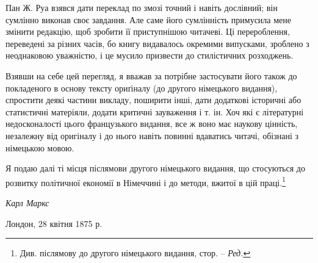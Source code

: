 Пан Ж. Руа взявся дати переклад по змозі точний і навіть
дослівний; він сумлінно виконав своє завдання. Але саме його
сумлінність примусила мене змінити редакцію, щоб зробити її
приступнішою читачеві. Ці перероблення, переведені за різних
часів, бо книгу видавалось окремими випусками, зроблено з
неоднаковою уважністю, і це мусило призвести до стилістичних
розходжень.

Взявши на себе цей перегляд, я вважав за потрібне застосувати
його також до покладеного в основу тексту ориґіналу (до другого
німецького видання), спростити деякі частини викладу, поширити
інші, дати додаткові історичні або статистичні матеріяли, додати
критичні зауваження і т. ін. Хоч які є літературні недосконалості
цього французького видання, все ж воно має наукову цінність,
незалежну від оригіналу і до нього навіть повинні вдаватись
читачі, обізнані з німецькою мовою.

Я подаю далі ті місця післямови другого німецького видання,
що стосуються до розвитку політичної економії в Німеччині і до
методи, вжитої в цій праці.\footnote*{
Див. післямову до другого німецького видання, стор. \pageref{original-81}--\pageref{original-88} \emph{Ред.}
}

\begin{flushright}
\emph{Карл Маркс}
\end{flushright}

{\small Лондон, 28 квітня 1875 р.}
